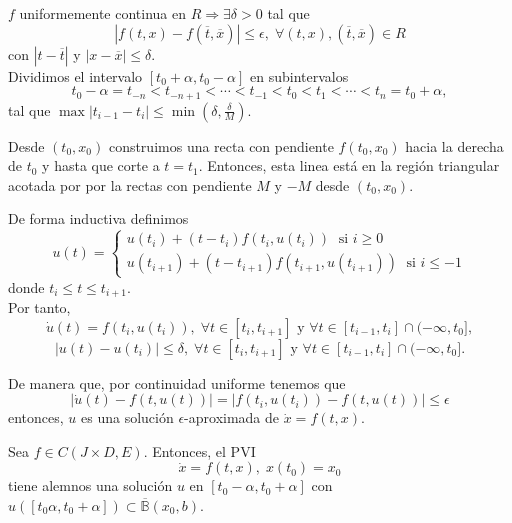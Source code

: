 \begin{dem}
  $f$ uniformemente continua en $R \Rightarrow \exists \delta >0$ tal que
  \[ 
    | f(t, x) - f(\overline{t}, \overline{x}) | \leq \epsilon, \; \forall (t,x),(\overline{t},\overline{x}) \in R 
  \] 
  con $|  t - \overline{t} |$ y $| x - \overline{x} | \leq \delta$. \\

  Dividimos el intervalo $[t_{0} + \alpha, t_{0} - \alpha]$ en subintervalos
  \[ 
    t_{0} - \alpha = t_{-n} < t_{-n+1} < \cdots < t_{-1} < t_{0} < t_{1} < \cdots < t_{n} = t_{0} + \alpha,
  \] 
  tal que $\max | t_{i-1} - t_{i} | \leq \min(\delta, \frac{\delta}{M})$.

  Desde $(t_{0}, x_{0})$ construimos una recta con pendiente $f(t_{0}, x_{0})$ hacia la derecha de $t_{0}$ y hasta que corte a $t = t_{1}$. Entonces, esta linea está en la región triangular acotada por por la rectas con pendiente $M$ y $-M$ desde $(t_{0}, x_{0})$.

  De forma inductiva definimos
  \[ 
    u(t) =
    \begin{cases}
      u(t_{i}) + (t - t_{i})f(t_{i}, u(t_{i})) \; \text{ si } i \geq 0 \\
      u(t_{i+1}) + (t - t_{i+1})f(t_{i+1}, u(t_{i+1})) \; \text{ si } i \leq -1
    \end{cases} 
  \] 
  donde $t_{i} \leq t \leq t_{i+1}$.\\

  Por tanto,
  \[
    \dot{u}(t) = f(t_{i}, u(t_{i})), \;   \forall t \in [t_{i}, t_{i+1}] \text{ y }\forall t \in [t_{i-1}, t_{i}] \cap (-\infty, t_{0}],
  \]
  \[
    | u(t) - u(t_{i}) | \leq \delta,  \; \forall t \in [t_{i}, t_{i+1}] \text{ y } \forall t \in [t_{i-1}, t_{i}] \cap (-\infty, t_{0}]. 
  \]

  De manera que, por continuidad uniforme tenemos que
  \[ 
    | \dot{u}(t) - f(t, u(t)) | = | f(t_{i}, u(t_{i})) - f(t, u(t))| \leq \epsilon
  \] 
  entonces, $u$ es una solución $\epsilon$-aproximada de $\dot{x} = f(t, x)$.
\end{dem}

\begin{theo}[Peano]
  Sea $f \in C(J \times D, E)$. Entonces, el PVI 
  \[ 
    \dot{x} = f(t,x), \; x(t_{0}) = x_{0} 
  \] 
  tiene alemnos una solución $u$ en $[t_{0} - \alpha, t_{0} + \alpha]$ con $u([t_{0}  \alpha, t_{0} +\alpha]) \subset \overline{\mathbb{B}}(x_{0}, b)$.
\end{theo}

